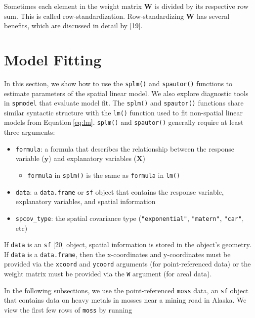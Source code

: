 \documentclass[10pt,letterpaper]{article}
\providecommand{\tightlist}{%
  \setlength{\itemsep}{0pt}\setlength{\parskip}{0pt}}
\begin{document}
Sometimes each element in the weight matrix \(\mathbf{W}\) is divided by
its respective row sum. This is called row-standardization.
Row-standardizing \(\mathbf{W}\) has several benefits, which are
discussed in detail by {[}19{]}.

\hypertarget{sec:modelfit}{%
\section{Model Fitting}\label{sec:modelfit}}

In this section, we show how to use the \texttt{splm()} and
\texttt{spautor()} functions to estimate parameters of the spatial
linear model. We also explore diagnostic tools in \texttt{spmodel} that
evaluate model fit. The \texttt{splm()} and \texttt{spautor()} functions
share similar syntactic structure with the \texttt{lm()} function used
to fit non-spatial linear models from Equation\(~\)\ref{eq:lm}.
\texttt{splm()} and \texttt{spautor()} generally require at least three
arguments:

\begin{itemize}
\tightlist
\item
  \texttt{formula}: a formula that describes the relationship between
  the response variable (\(\mathbf{y}\)) and explanatory variables
  (\(\mathbf{X}\))

  \begin{itemize}
  \tightlist
  \item
    \texttt{formula} in \texttt{splm()} is the same as \texttt{formula}
    in \texttt{lm()}
  \end{itemize}
\item
  \texttt{data}: a \texttt{data.frame} or \texttt{sf} object that
  contains the response variable, explanatory variables, and spatial
  information
\item
  \texttt{spcov\_type}: the spatial covariance type
  (\texttt{"exponential"}, \texttt{"matern"}, \texttt{"car"}, etc)
\end{itemize}

If \texttt{data} is an \texttt{sf} {[}20{]} object, spatial information
is stored in the object's geometry. If \texttt{data} is a
\texttt{data.frame}, then the x-coordinates and y-coordinates must be
provided via the \texttt{xcoord} and \texttt{ycoord} arguments (for
point-referenced data) or the weight matrix must be provided via the
\texttt{W} argument (for areal data).

In the following subsections, we use the point-referenced \texttt{moss}
data, an \texttt{sf} object that contains data on heavy metals in mosses
near a mining road in Alaska. We view the first few rows of
\texttt{moss} by running
\end{document}
